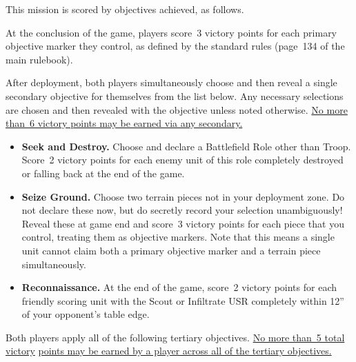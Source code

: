 


This mission is scored by objectives achieved, as follows.

 At the conclusion of the game,
players score~3 victory points for each primary objective marker they
control, as defined by the standard rules (page~134 of the main
rulebook).



After deployment, both players simultaneously choose and then reveal a
single secondary objective for themselves from the list below.  Any
necessary selections are chosen and then revealed with the objective
unless noted otherwise.  \underline{No more than~6 victory points may
  be earned via any secondary.}

\begin{itemize}
\item \textbf{Seek and Destroy.}  Choose and declare a Battlefield
  Role other than Troop.  Score~2 victory points for each enemy unit
  of this role completely destroyed or falling back at the end of the
  game.

\item \textbf{Seize Ground.}  Choose two terrain pieces not in your
  deployment zone.  Do not declare these now, but do secretly record
  your selection unambiguously!  Reveal these at game end and score~3
  victory points for each piece that you control, treating them as
  objective markers.  Note that this means a single unit cannot claim
  both a primary objective marker and a terrain piece simultaneously.

\item \textbf{Reconnaissance.}  At the end of the game, score~2
  victory points for each friendly scoring unit with the Scout or
  Infiltrate USR completely within 12'' of your opponent's table edge.

\end{itemize}


  Both players apply all of
the following tertiary objectives.  \underline{No more than~5 total
  victory} \underline{points may be earned by a player across all of
  the tertiary objectives.}

